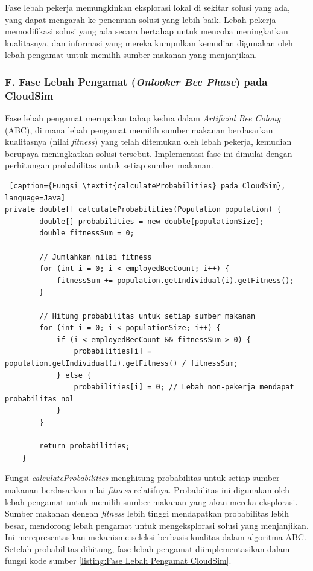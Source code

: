 Fase lebah pekerja memungkinkan eksplorasi lokal di sekitar solusi yang ada, yang dapat mengarah ke penemuan solusi yang lebih baik. Lebah pekerja memodifikasi solusi yang ada secara bertahap untuk mencoba meningkatkan kualitasnya, dan informasi yang mereka kumpulkan kemudian digunakan oleh lebah pengamat untuk memilih sumber makanan yang menjanjikan.

\subsubsection{F. Fase Lebah Pengamat (\textit{Onlooker Bee Phase}) pada CloudSim}
Fase lebah pengamat merupakan tahap kedua dalam \textit{Artificial Bee Colony} (ABC), di mana lebah pengamat memilih sumber makanan berdasarkan kualitasnya (nilai \textit{fitness}) yang telah ditemukan oleh lebah pekerja, kemudian berupaya meningkatkan solusi tersebut. Implementasi fase ini dimulai dengan perhitungan probabilitas untuk setiap sumber makanan.

\begin{lstlisting} [caption={Fungsi \textit{calculateProbabilities} pada CloudSim}, language=Java]
private double[] calculateProbabilities(Population population) {
        double[] probabilities = new double[populationSize];
        double fitnessSum = 0;
        
        // Jumlahkan nilai fitness
        for (int i = 0; i < employedBeeCount; i++) {
            fitnessSum += population.getIndividual(i).getFitness();
        }
        
        // Hitung probabilitas untuk setiap sumber makanan
        for (int i = 0; i < populationSize; i++) {
            if (i < employedBeeCount && fitnessSum > 0) {
                probabilities[i] = population.getIndividual(i).getFitness() / fitnessSum;
            } else {
                probabilities[i] = 0; // Lebah non-pekerja mendapat probabilitas nol
            }
        }
        
        return probabilities;
    }
\end{lstlisting}

Fungsi \textit{calculateProbabilities} menghitung probabilitas untuk setiap sumber makanan berdasarkan nilai \textit{fitness} relatifnya. Probabilitas ini digunakan oleh lebah pengamat untuk memilih sumber makanan yang akan mereka eksplorasi. Sumber makanan dengan \textit{fitness} lebih tinggi mendapatkan probabilitas lebih besar, mendorong lebah pengamat untuk mengeksplorasi solusi yang menjanjikan. Ini merepresentasikan mekanisme seleksi berbasis kualitas dalam algoritma ABC. Setelah probabilitas dihitung, fase lebah pengamat diimplementasikan dalam fungsi kode sumber \ref{listing:Fase Lebah Pengamat CloudSim}.

